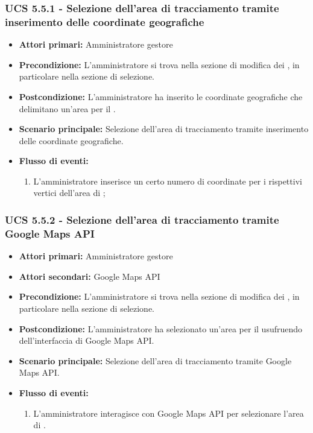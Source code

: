 \subsubsection{UCS 5.5.1 - Selezione dell'area di tracciamento tramite inserimento delle coordinate geografiche}%
\begin{itemize}
\item \textbf{Attori primari:} Amministratore gestore
\item \textbf{Precondizione:} L'amministratore si trova nella sezione di modifica dei , in particolare nella sezione di selezione.
\item \textbf{Postcondizione:} L'amministratore ha inserito le coordinate geografiche che delimitano un'area per il .
\item \textbf{Scenario principale:} Selezione dell'area di tracciamento tramite inserimento delle coordinate geografiche.
\item \textbf{Flusso di eventi:}
\begin{enumerate}
    \item L'amministratore inserisce un certo numero di coordinate per i rispettivi vertici dell'area di ;
\end{enumerate}
\end{itemize}

\subsubsection{UCS 5.5.2 - Selezione dell'area di tracciamento tramite Google Maps API}%
\begin{itemize}
\item \textbf{Attori primari:} Amministratore gestore
\item \textbf{Attori secondari:} Google Maps API
\item \textbf{Precondizione:} L'amministratore si trova nella sezione di modifica dei , in particolare nella sezione di selezione.
\item \textbf{Postcondizione:} L'amministratore ha selezionato un'area per il  usufruendo dell'interfaccia di Google Maps API.
\item \textbf{Scenario principale:} Selezione dell'area di tracciamento tramite Google Maps API.
\item \textbf{Flusso di eventi:}
\begin{enumerate}
    \item L'amministratore interagisce con Google Maps API per selezionare l'area di .
\end{enumerate}
\end{itemize}

